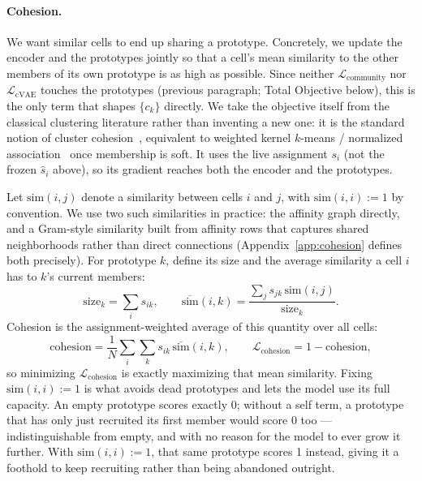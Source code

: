 \paragraph{Cohesion.}
We want similar cells to end up sharing a prototype. Concretely, we update the encoder and the prototypes jointly so that a cell's mean similarity to the other members of its own prototype is as high as possible. Since neither $\mathcal{L}_{\text{community}}$ nor $\mathcal{L}_{\text{cVAE}}$ touches the prototypes (previous paragraph; Total Objective below), this is the only term that shapes $\{c_k\}$ directly. We take the objective itself from the classical clustering literature rather than inventing a new one: it is the standard notion of cluster cohesion~\citep{tan2005data}, equivalent to weighted kernel $k$-means / normalized association~\citep{dhillon2004kernel} once membership is soft. It uses the live assignment $s_i$ (not the frozen $\hat{s}_i$ above), so its gradient reaches both the encoder and the prototypes.

Let $\mathrm{sim}(i,j)$ denote a similarity between cells $i$ and $j$, with $\mathrm{sim}(i,i) := 1$ by convention. We use two such similarities in practice: the affinity graph directly, and a Gram-style similarity built from affinity rows that captures shared neighborhoods rather than direct connections (Appendix~\ref{app:cohesion} defines both precisely). For prototype $k$, define its size and the average similarity a cell $i$ has to $k$'s current members:
\begin{equation}
\mathrm{size}_k = \sum_i s_{ik}, \qquad
\overline{\mathrm{sim}}(i,k) = \frac{\sum_j s_{jk}\, \mathrm{sim}(i,j)}{\mathrm{size}_k}.
\end{equation}
Cohesion is the assignment-weighted average of this quantity over all cells:
\begin{equation}
\mathrm{cohesion} = \frac{1}{N}\sum_i \sum_k s_{ik}\, \overline{\mathrm{sim}}(i,k),
\qquad
\mathcal{L}_{\text{cohesion}} = 1 - \mathrm{cohesion},
\end{equation}
so minimizing $\mathcal{L}_{\text{cohesion}}$ is exactly maximizing that mean similarity. Fixing $\mathrm{sim}(i,i):=1$ is what avoids dead prototypes and lets the model use its full capacity. An empty prototype scores exactly 0; without a self term, a prototype that has only just recruited its first member would score 0 too --- indistinguishable from empty, and with no reason for the model to ever grow it further. With $\mathrm{sim}(i,i):=1$, that same prototype scores 1 instead, giving it a foothold to keep recruiting rather than being abandoned outright.

